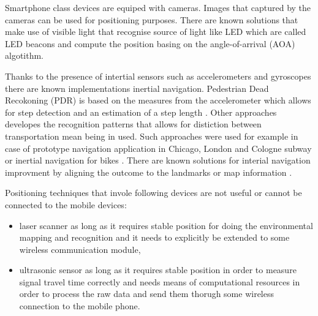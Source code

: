 \documentclass[../main.tex]{subfiles}
\begin{document}
Smartphone class devices are equiped with cameras. Images that captured by the cameras can be used for positioning purposes. There are known solutions that make use of visible light \cite{visible_light_positioning} that recognise source of light like LED which are called LED beacons and compute the position basing on the angle-of-arrival (AOA) algotithm.

Thanks to the presence of intertial sensors such as accelerometers and gyroscopes there are known implementations inertial navigation. Pedestrian Dead Recokoning (PDR) is based on the measures from the accelerometer which allows for step detection and an estimation of a step length \cite{inertial_navi_unaided} \cite{inertial_navi_pocket} \cite{inertial_navi_velocity_model}. Other approaches developes the recognition patterns that allows for distiction between transportation mean being in used. Such approaches were used for example in case of prototype navigation application in Chicago, London and Cologne subway \cite{inertial_navi_subway} or inertial navigation for bikes \cite{inertial_navi_bike}. There are known solutions for interial navigation improvment by aligning the outcome to the landmarks or map information \cite{positioning_tests}.

Positioning techniques that invole following devices are not useful or cannot be connected to the mobile devices:
\begin{itemize}
	\item laser scanner as long as it requires stable position for doing the environmental mapping and recognition and it needs to explicitly be extended to some wireless communication module,
	\item ultrasonic sensor as long as it requires stable position in order to measure signal travel time correctly and needs means of computational resources in order to process the raw data and send them thorugh some wireless connection to the mobile phone.
\end{itemize}
\end{document}
